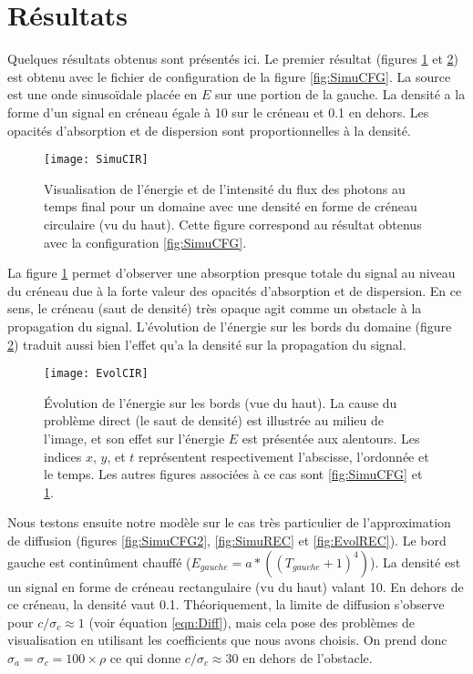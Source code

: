 
\section{Résultats}

Quelques résultats obtenus sont présentés ici. Le premier résultat (figures \ref{fig:SimuCIR} et \ref{fig:EvolCIR}) est obtenu avec le fichier de configuration de la figure \ref{fig:SimuCFG}. La source est une onde sinusoïdale placée en $E$ sur une portion de la gauche. La densité a la forme d'un signal en créneau égale à 10 sur le créneau et 0.1 en dehors. Les opacités d'absorption et de dispersion sont proportionnelles à la densité.

\begin{figure}[!h]
\centering
\texttt{[image: SimuCIR]} 
\decoRule
\caption[SimuCIR]{Visualisation de l'énergie et de l'intensité du flux des photons au temps final pour un domaine avec une densité en forme de créneau circulaire (vu du haut). Cette figure correspond au résultat obtenus avec la configuration \ref{fig:SimuCFG}.}
\label{fig:SimuCIR}
\end{figure}

La figure \ref{fig:SimuCIR} permet d'observer une absorption presque totale du signal au niveau du créneau due à la forte valeur des opacités d'absorption et de dispersion. En ce sens, le créneau (saut de densité) très opaque agit comme un obstacle à la propagation du signal. L'évolution de l'énergie sur les bords du domaine (figure \ref{fig:EvolCIR}) traduit aussi bien l'effet qu'a la densité sur la propagation du signal.

\begin{figure}[H]
\centering
\texttt{[image: EvolCIR]} 
\decoRule
\caption[EvolCIR]{Évolution de l'énergie sur les bords (vue du haut). La cause du problème direct (le saut de densité) est illustrée au milieu de l'image, et son effet sur l'énergie $E$ est présentée aux alentours. Les indices $x$, $y$, et $t$ représentent respectivement l'abscisse, l'ordonnée et le temps. Les autres figures associées à ce cas sont \ref{fig:SimuCFG} et \ref{fig:SimuCIR}.}
\label{fig:EvolCIR}
\end{figure}

Nous testons ensuite notre modèle sur le cas très particulier de l'approximation de diffusion (figures \ref{fig:SimuCFG2}, \ref{fig:SimuREC} et \ref{fig:EvolREC}). Le bord gauche est continûment chauffé ($E_{gauche} = a*((T_{gauche}+1)^4)$). La densité est un signal en forme de créneau rectangulaire (vu du haut) valant 10. En dehors de ce créneau, la densité vaut 0.1. Théoriquement, la limite de diffusion s'observe pour $c/\sigma_c \approx 1$ (voir équation \ref{eqn:Diff}), mais cela pose des problèmes de visualisation en utilisant les coefficients que nous avons choisis. On prend donc $\sigma_a = \sigma_c = 100 \times \rho$ ce qui donne $c / \sigma_c \approx 30$ en dehors de l'obstacle.

